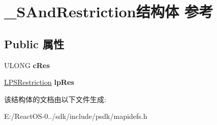 \hypertarget{struct___s_and_restriction}{}\section{\+\_\+\+S\+And\+Restriction结构体 参考}
\label{struct___s_and_restriction}
\subsection*{Public 属性}
\begin{DoxyCompactItemize}
\item 
\mbox{\label{struct___s_and_restriction_a7363a6545498eea1213037e224a6e2a3}} 
U\+L\+O\+NG {\bfseries c\+Res}
\item 
\mbox{\label{struct___s_and_restriction_adb01b2c2ab3450fa1ea486df4891b985}} 
\hyperlink{struct___s_restriction}{L\+P\+S\+Restriction} {\bfseries lp\+Res}
\end{DoxyCompactItemize}


该结构体的文档由以下文件生成\+:\begin{DoxyCompactItemize}
\item 
E\+:/\+React\+O\+S-\/0../sdk/include/psdk/mapidefs.\+h\end{DoxyCompactItemize}
